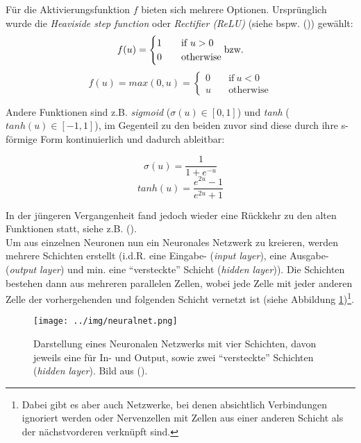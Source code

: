Für die Aktivierungsfunktion $f$ bieten sich mehrere Optionen. Ursprünglich wurde die \emph{Heaviside step function}
oder \emph{Rectifier (ReLU)} (siehe bspw. (\cite{abramowitz1964handbook})) gewählt:
\begin{equation}
    f(u) = \begin{cases} 1 & \quad \text{if}\ u > 0 \\ 0 & \quad \text{otherwise} \\ \end{cases} \text{bzw.} \\
\end{equation}
\begin{equation}
  f(u) = max(0,u) = \begin{cases} 0 & \quad \text{if}\ u < 0 \\ u & \quad \text{otherwise} \end{cases}
\end{equation}

Andere Funktionen sind z.B. \emph{sigmoid} ($\sigma(u) \in [0,1]$)
und \emph{tanh} ($tanh(u) \in [-1, 1]$), im Gegenteil zu den beiden zuvor sind diese durch ihre s-förmige Form
kontinuierlich und dadurch ableitbar:

\begin{equation}
  \sigma(u) = \frac{1}{1 + e^{-u}}
\end{equation}
\begin{equation}
  tanh(u) = \frac{e^{2u}-1}{e^{2u}+1}
\end{equation}

In der jüngeren Vergangenheit fand jedoch wieder eine Rückkehr zu den alten Funktionen statt, siehe z.B. (\cite{maas2013rectifier}).\\

Um aus einzelnen Neuronen nun ein Neuronales Netzwerk zu kreieren, werden mehrere Schichten erstellt (i.d.R. eine Eingabe-
(\emph{input layer}), eine Ausgabe- (\emph{output layer}) und min. eine ``versteckte'' Schicht (\emph{hidden layer})).
Die Schichten bestehen dann aus mehreren parallelen Zellen, wobei jede Zelle mit jeder anderen Zelle der vorhergehenden und
folgenden Schicht vernetzt ist (siehe Abbildung \ref{fig:neuralnet})\footnote{Dabei gibt es aber auch Netzwerke, bei denen
absichtlich Verbindungen ignoriert werden oder Nervenzellen mit Zellen aus einer anderen Schicht als der nächstvorderen
verknüpft sind.}.

\begin{figure}[h]
  \centering
  \texttt{[image: ../img/neuralnet.png]}
  \caption[Darstellung eine Neuronalen Netzwerks]{Darstellung eines Neuronalen Netzwerks mit vier Schichten, davon jeweils eine
  für In- und Output, sowie zwei ``versteckte'' Schichten (\emph{hidden layer}). Bild aus (\cite{Goldberg15c}).\label{fig:neuralnet}}
\end{figure}

